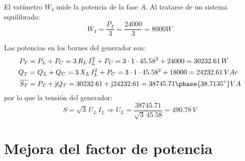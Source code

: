 \begin{example}
El vatímetro $W_4$ mide la potencia de la fase $A$. Al tratarse de un sistema equilibrado:
\begin{equation*}
    W_4=\dfrac{P_T}{3}=\dfrac{24000}{3}=8000W
\end{equation*}

Las potencias en los bornes del generador son:
\begin{align*}
    P_T&=P_L+P_C=3\,R_L\,I_L^2+P_C=3\cdot 1\cdot 45.58^2+24000=30232.61\,W\\
    Q_T&=Q_L+Q_C=3\,X_L\,I_L^2+P_C=3\cdot 1\cdot 45.58^2+18000=24232.61\,VAr\\
    \overline{S_T}&=P_T+\mathrm{j}Q_T=30232.61+\mathrm{j}24232.61=38745.71\phase{38.7135^\circ} VA
\end{align*}
por lo que la tensión del generador:
\begin{equation*}
    S=\sqrt{3}\,U_L\, I_L\Rightarrow U_L=\dfrac{38745.71}{\sqrt{3}\,45.58}=490.78\,V
\end{equation*}
\end{example}

		\section{Mejora del factor de potencia}
		
		
		
